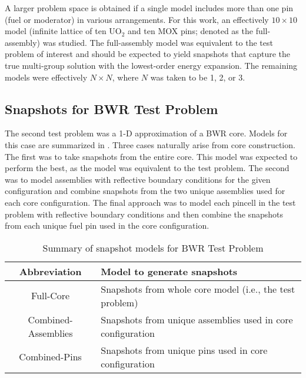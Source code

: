 A larger problem space is obtained if a single model includes more than one pin 
(fuel or moderator) in various arrangements.  For this work, an effectively 
$10\times 10$ model (infinite lattice of ten UO$_2$ and ten MOX pins; denoted 
as the full-assembly) was studied.  The full-assembly model was equivalent to the test problem 
of interest and should be expected to yield snapshots that capture the true 
multi-group solution with the lowest-order energy expansion.  The remaining 
models were effectively $N\times N$, where $N$ was taken to be 1, 2, or 3.

\subsection{Snapshots for BWR Test Problem}

The second test problem was a 1-D approximation of a BWR core.  Models for 
this case are summarized in .  Three cases 
naturally arise from core construction.  The first was to take snapshots from 
the entire core.  This model was expected to perform the best, as the model was 
equivalent to the test problem.  The second was to model assemblies with 
reflective 
boundary conditions for the given configuration and combine snapshots from the 
two unique assemblies used for each core configuration.  The final approach was 
to model each pincell in the test problem with reflective boundary conditions 
and then combine the snapshots from each unique fuel pin used in the core 
configuration.  

\begin{table*}[htb]
    \centering
    \caption{Summary of snapshot models for BWR Test Problem}
    \begin{tabulary}{\linewidth}{c | L}\toprule
        Abbreviation         & Model to generate snapshots \\ \midrule
        Full-Core            & Snapshots from whole core model (i.e., the test 
        problem) \\
        Combined-Assemblies  & Snapshots from unique assemblies used in core 
        configuration \\
        Combined-Pins        & Snapshots from unique pins used in core 
        configuration \\
        \bottomrule
    \end{tabulary}
    \label{tab:bwrsnapshots}
\end{table*}

